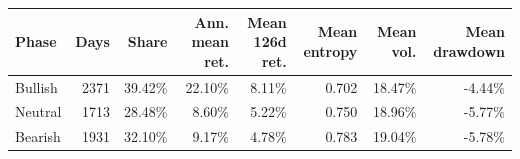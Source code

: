 \begin{tabular}{lrrrrrrr}
\hline
Phase & Days & Share & Ann. mean ret. & Mean 126d ret. & Mean entropy & Mean vol. & Mean drawdown \\
\hline
Bullish & 2371 & 39.42\% & 22.10\% & 8.11\% & 0.702 & 18.47\% & -4.44\% \\
Neutral & 1713 & 28.48\% & 8.60\% & 5.22\% & 0.750 & 18.96\% & -5.77\% \\
Bearish & 1931 & 32.10\% & 9.17\% & 4.78\% & 0.783 & 19.04\% & -5.78\% \\
\hline
\end{tabular}
